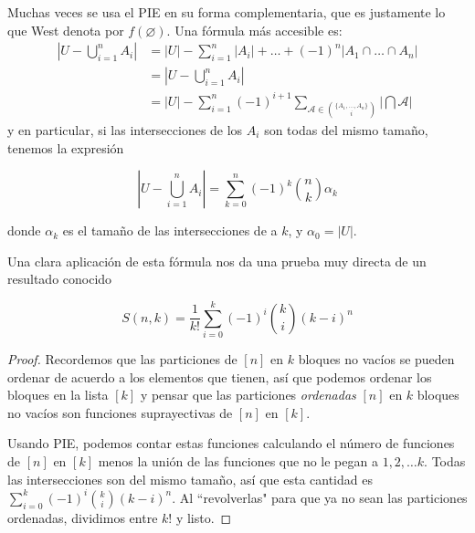 Muchas veces se usa el PIE en su forma
complementaria, que es justamente lo que West
denota por $f(\varnothing)$. Una fórmula más
accesible es:
$$
\begin{aligned}
 \left|U-\bigcup_{i = 1}^nA_i \right|& = |U|-
\sum_{i = 1}^n|A_i| +  \ldots +
(-1)^n|A_1\cap \ldots\cap A_n|\\
&=\left|U-\bigcup_{i=1}^nA_i\right|\\
& = |U|- \sum_{i = 1}^n(-1)^{i + 1}
\sum_{\mathcal{A}\in{\{A_1, \ldots,A_n\}
\choose i}} \left|\bigcap \mathcal{A}
\right|\end{aligned}
$$
y en particular, si las intersecciones de los
$A_i$ son todas del mismo tamaño, tenemos la
expresión

$$
 \left|U-\bigcup_{i = 1}^nA_i \right| =
\sum_{k = 0}^n(-1)^k{n \choose k}\alpha_k
$$

donde $\alpha_k$ es el tamaño de las
intersecciones de a $k$, y $\alpha_0 = |U|$.

Una clara aplicación de esta fórmula nos da
una prueba muy directa de un resultado
conocido
\begin{theorem}
\label{%
theorem-stirling-inclusion-exclusion}

$$
S(n,k) =  \frac{1}{k!} \sum_{i = 0}^k(-1)^i{k
\choose i}(k-i)^n
$$

\end{theorem}
\begin{proof}
Recordemos que las particiones de $[n]$ en
$k$ bloques no vacíos se pueden ordenar de
acuerdo a los elementos que tienen, así que
podemos ordenar los bloques en la lista $[k]$
y pensar que las particiones
\textit{ordenadas} $[n]$ en $k$ bloques no
vacíos son funciones suprayectivas de $[n]$
en $[k]$.

Usando PIE, podemos contar estas funciones
calculando el número de funciones de $[n]$ en
$[k]$ menos la unión de las funciones que no
le pegan a $1,2, \ldots k$. Todas las
intersecciones son del mismo tamaño, así que
esta cantidad es $ \sum_{i = 0}^k(-1)^i{k
\choose i}(k-i)^n$. Al ``revolverlas" para
que ya no sean las particiones ordenadas,
dividimos entre $k!$ y listo.
\end{proof}

